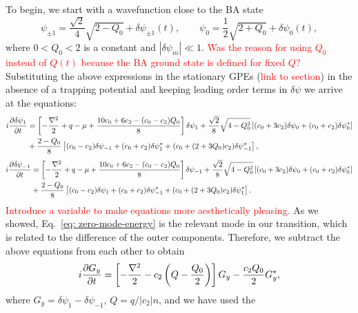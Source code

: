To begin, we start with a wavefunction close to the BA state
\begin{equation}
    \psi_{\pm 1} = \frac{\sqrt{2}}{4}\sqrt{2 - Q_0} + \delta\psi_{\pm 1}(t),
    \qquad
    \psi_0 = \frac{1}{2}\sqrt{2 + Q_0} + \delta \psi_0(t),
\end{equation}
where $0 < Q_0 < 2$ is a constant and $|\delta\psi_m| \ll 1$.
\textcolor{red}{Was the reason for using $Q_0$ instead of $Q(t)$ because
the BA ground state is defined for fixed $Q$?}
Substituting the above expressions in the stationary GPEs
(\textcolor{red}{link to section}) in the absence of a trapping potential and
keeping leading order terms in $\delta\psi$ we
arrive at the equations:
\begin{equation}
    \begin{aligned}
        i\pdv{\delta\psi_1}{t} &= \left[-\frac{\nabla^2}{2} + q - \mu 
        + \frac{10c_0+6c_2-(c_0-c_2)Q_0}{8}\right]\delta\psi_1 
        + \frac{\sqrt{2}}{8}\sqrt{4-Q_0^2}\left[(c_0+3c_2)\delta\psi_0 
        + (c_0+c_2)\delta\psi_0^*\right] \\
        &+ \frac{2-Q_0}{8}\left[(c_0-c_2)\delta\psi_{-1}
        + (c_0+c_2)\delta\psi_1^* 
        + (c_0 + (2+3Q_0)c_2)\delta\psi_{-1}^*\right],
    \end{aligned}
\end{equation}
\begin{equation} 
    \begin{aligned}
        i\pdv{\delta\psi_{-1}}{t} &= \left[-\frac{\nabla^2}{2} + q - \mu 
        + \frac{10c_0+6c_2-(c_0-c_2)Q_0}{8}\right]\delta\psi_{-1} 
        + \frac{\sqrt{2}}{8}\sqrt{4-Q_0^2}\left[(c_0+3c_2)\delta\psi_0 
        + (c_0+c_2)\delta\psi_0^*\right] \\
        &+ \frac{2-Q_0}{8}\left[(c_0-c_2)\delta\psi_{1}
        + (c_0+c_2)\delta\psi_{-1}^* 
        + (c_0 + (2+3Q_0)c_2)\delta\psi_{1}^*\right].
    \end{aligned}
\end{equation}
\textcolor{red}{Introduce a variable to make equations more aesthetically
pleasing.}
As we showed, Eq.~\eqref{eq: zero-mode-energy} is the relevant mode in our
transition, which is related to the difference of the outer components.
Therefore, we subtract the above equations from each other to obtain
\begin{equation}
    i\pdv{G_y}{t} = \left[-\frac{\nabla^2}{2} - c_2\left(Q 
    - \frac{Q_0}{2}\right)\right]G_y - \frac{c_2Q_0}{2}G_y^*,
\end{equation}
where $G_y = \delta\psi_1 - \delta\psi_{-1}$, $Q=q/|c_2|n$, and we have used the
